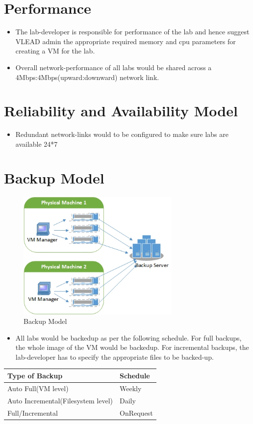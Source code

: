\documentclass[11pt]{article}
\begin{document}
\section{Performance}
\label{sec-7}

  
\begin{itemize}
\item The lab-developer is responsible for performance of the lab and
    hence suggest VLEAD admin the appropriate required memory and cpu
    parameters for creating a VM for the lab.
\item Overall network-performance of all labs would be shared across a
    4Mbps:4Mbps(upward:downward) network link.
\end{itemize}
\section{Reliability and Availability Model}
\label{sec-8}


\begin{itemize}
\item Redundant network-links would to be configured to make sure labs are
    available 24*7
\end{itemize}
\section{Backup Model}
\label{sec-9}


   \begin{figure}[H]
\centering
\includegraphics[width=8cm]{backup-model.jpg}
\caption{Backup Model}
\end{figure}

\begin{itemize}
\item All labs would be backedup as per the following schedule. For full
    backups, the whole image of the VM would be backedup. For
    incremental backups, the lab-developer has to specify the
    appropriate files to be backed-up.
\end{itemize}

\begin{center}
\begin{tabular}{ll}
\hline
 Type of Backup                      &  Schedule   \\
\hline
 Auto Full(VM level)                 &  Weekly     \\
 Auto Incremental(Filesystem level)  &  Daily      \\
 Full/Incremental                    &  OnRequest  \\
\hline
\end{tabular}
\end{center}
\end{document}

